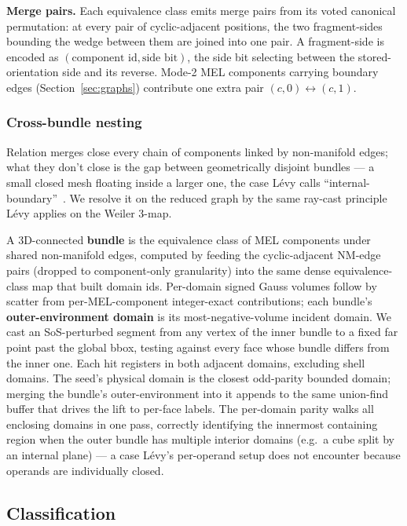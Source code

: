 \documentclass{egpubl}
\begin{document}
\textbf{Merge pairs.} Each equivalence class emits merge pairs from its voted canonical permutation: at every pair of cyclic-adjacent positions, the two fragment-sides bounding the wedge between them are joined into one pair. A fragment-side is encoded as $(\text{component id}, \text{side bit})$, the side bit selecting between the stored-orientation side and its reverse. Mode-2 MEL components carrying boundary edges (Section~\ref{sec:graphs}) contribute one extra pair $(c, 0) \leftrightarrow (c, 1)$.

\subsubsection*{Cross-bundle nesting}

Relation merges close every chain of components linked by non-manifold edges; what they don't close is the gap between geometrically disjoint bundles --- a small closed mesh floating inside a larger one, the case L\'evy calls ``internal-boundary''~\cite{Levy2025}. We resolve it on the reduced graph by the same ray-cast principle L\'evy applies on the Weiler 3-map.

A 3D-connected \textbf{bundle} is the equivalence class of MEL components under shared non-manifold edges, computed by feeding the cyclic-adjacent NM-edge pairs (dropped to component-only granularity) into the same dense equivalence-class map that built domain ids. Per-domain signed Gauss volumes follow by scatter from per-MEL-component integer-exact contributions; each bundle's \textbf{outer-environment domain} is its most-negative-volume incident domain. We cast an SoS-perturbed segment from any vertex of the inner bundle to a fixed far point past the global bbox, testing against every face whose bundle differs from the inner one. Each hit registers in both adjacent domains, excluding shell domains. The seed's physical domain is the closest odd-parity bounded domain; merging the bundle's outer-environment into it appends to the same union-find buffer that drives the lift to per-face labels. The per-domain parity walks all enclosing domains in one pass, correctly identifying the innermost containing region when the outer bundle has multiple interior domains (e.g.\ a cube split by an internal plane) --- a case L\'evy's per-operand setup does not encounter because operands are individually closed.

\subsection{Classification}
\label{sec:classification}
\end{document}
